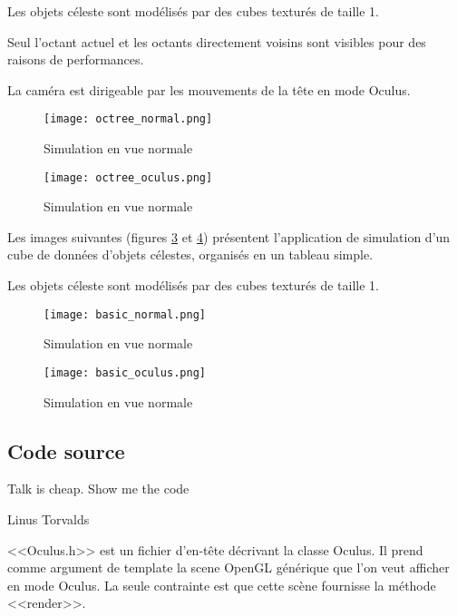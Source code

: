 \documentclass[a4paper,french,12pt]{article}
\begin{document}
		Les objets céleste sont modélisés par des cubes texturés de taille 1.

		Seul l'octant actuel et les octants directement voisins sont visibles pour des raisons de performances.

		La caméra est dirigeable par les mouvements de la tête en mode Oculus.


		\begin{figure}
			      \centering
			      \texttt{[image: octree\_normal.png]}
			      \caption{Simulation en vue normale}
			      \label{octree_normal}
		\end{figure}

		\begin{figure}
			      \centering
			      \texttt{[image: octree\_oculus.png]}
			      \caption{Simulation en vue normale}
			      \label{octree_oculus}
		\end{figure}
		\FloatBarrier

		Les images suivantes (figures \ref{basic_normal} et \ref{basic_oculus}) présentent l'application de simulation d'un cube de données d'objets célestes,
		organisés en un tableau simple.

		Les objets céleste sont modélisés par des cubes texturés de taille 1.

		\begin{figure}
			      \centering
			      \texttt{[image: basic\_normal.png]}
			      \caption{Simulation en vue normale}
			      \label{basic_normal}
		\end{figure}

		\begin{figure}
			      \centering
			      \texttt{[image: basic\_oculus.png]}
			      \caption{Simulation en vue normale}
			      \label{basic_oculus}
		\end{figure}
		\FloatBarrier

	\newpage
	\subsection{Code source}
	\epigraph{Talk is cheap. Show me the code}{Linus Torvalds}

	\FloatBarrier
	<<Oculus.h>> est un fichier d'en-tête décrivant la classe Oculus. Il prend comme argument de template la scene
	OpenGL générique que l'on veut afficher en mode Oculus. La seule contrainte est que cette scène fournisse
	la méthode <<render>>.
	
	\FloatBarrier
\end{document}
